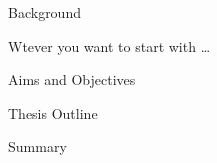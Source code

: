 

\begin{introduction}

\begin{section}{Background}
\begin{subsection}{Wtever you want to start with  \dots}
{}
\end{subsection}
\begin{section}{Aims and Objectives}
{}
\end{section}
\begin{section}{Thesis Outline}
{}
\end{section}

\begin{section}{Summary}
{}
\end{section}


\end{section}
\end{introduction}

